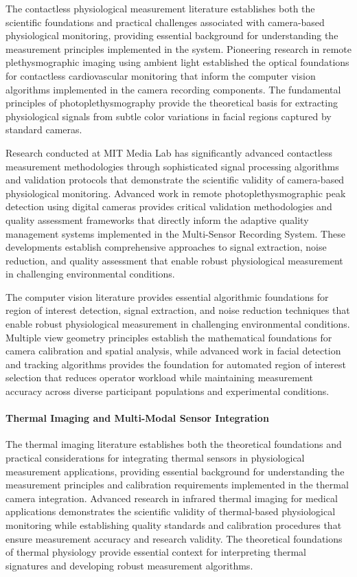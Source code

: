 \documentclass[12pt,a4paper]{report}
\begin{document}
The contactless physiological measurement literature establishes both the scientific foundations and practical
challenges associated with camera-based physiological monitoring, providing essential background for understanding the
measurement principles implemented in the system. Pioneering research in remote plethysmographic imaging using ambient
light established the optical foundations for contactless cardiovascular monitoring that inform the computer vision
algorithms implemented in the camera recording components. The fundamental principles of photoplethysmography provide
the theoretical basis for extracting physiological signals from subtle color variations in facial regions captured by
standard cameras.

Research conducted at MIT Media Lab has significantly advanced contactless measurement methodologies through
sophisticated signal processing algorithms and validation protocols that demonstrate the scientific validity of
camera-based physiological monitoring. Advanced work in remote photoplethysmographic peak detection using digital
cameras provides critical validation methodologies and quality assessment frameworks that directly inform the adaptive
quality management systems implemented in the Multi-Sensor Recording System. These developments establish comprehensive
approaches to signal extraction, noise reduction, and quality assessment that enable robust physiological measurement in
challenging environmental conditions.

The computer vision literature provides essential algorithmic foundations for region of interest detection, signal
extraction, and noise reduction techniques that enable robust physiological measurement in challenging environmental
conditions. Multiple view geometry principles establish the mathematical foundations for camera calibration and spatial
analysis, while advanced work in facial detection and tracking algorithms provides the foundation for automated region
of interest selection that reduces operator workload while maintaining measurement accuracy across diverse participant
populations and experimental conditions.

\paragraph{Thermal Imaging and Multi-Modal Sensor Integration}

The thermal imaging literature establishes both the theoretical foundations and practical considerations for integrating
thermal sensors in physiological measurement applications, providing essential background for understanding the
measurement principles and calibration requirements implemented in the thermal camera integration. Advanced research in
infrared thermal imaging for medical applications demonstrates the scientific validity of thermal-based physiological
monitoring while establishing quality standards and calibration procedures that ensure measurement accuracy and research
validity. The theoretical foundations of thermal physiology provide essential context for interpreting thermal
signatures and developing robust measurement algorithms.
\end{document}
